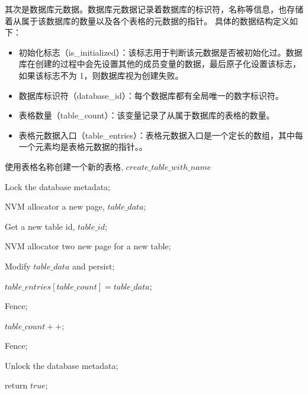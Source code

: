 其次是数据库元数据。数据库元数据记录着数据库的标识符，名称等信息，也存储着从属于该数据库的数量以及各个表格的元数据的指针。
具体的数据结构定义如下：
\begin{itemize}
    \item 初始化标志（is\_initialized）：该标志用于判断该元数据是否被初始化过。数据库在创建的过程中会先设置其他的成员变量的数据，最后原子化设置该标志，如果该标志不为 1，则数据库视为创建失败。
    \item 数据库标识符（database\_id）：每个数据库都有全局唯一的数字标识符。
    \item 表格数量（table\_count）：该变量记录了从属于数据库的表格的数量。
    \item 表格元数据入口（table\_entries）：表格元数据入口是一个定长的数组，其中每一个元素均是表格元数据的指针。。
\end{itemize}


\begin{algorithm}[ht]
    \caption{使用表格名称创建一个新的表格, $create\_table\_with\_name$}
    \label{alg:create-table}
    \BlankLine
    Lock the database metadata;


    NVM allocator a new page, $table\_data$;

    Get a new table id, $table\_id$;

    NVM allocator two new page for a new table;

    Modify $table\_data$ and persist;

    $table\_entries[table\_count] = table\_data$;

    Fence;

    $table\_count++$;

    Fence;

    Unlock the database metadata;

    return $true$;
\end{algorithm}


